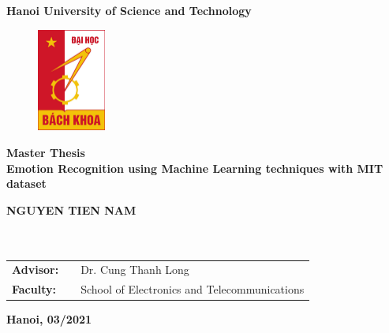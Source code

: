 
\begin{titlepage}
\thispagestyle{empty}
\begin{center}
\textbf{\large{Hanoi University of Science and Technology}} \\

\vspace{0.2cm}

\begin{figure}[htbp]
    \begin{center}
    \includegraphics[width=0.2\textwidth]{figs/hust-logo.jpg}
    \end{center}
\end{figure}

\vspace{0.5cm}

\textbf{\Huge{Master Thesis}} \\
\vspace{1.2cm}
\textbf{\LARGE{Emotion Recognition using Machine Learning techniques with MIT dataset}} \\

\vspace{1.0cm}

\textbf{\large{NGUYEN TIEN NAM}} \\
\small{\emailofauthor} \\
\vspace{0.3cm}
\textbf{\large{\majorofauthor}} \\
\vspace{2.5cm}

\small
\renewcommand{\arraystretch}{1.5} 
\begin{tabular}{lll}
    \textbf{Advisor:} & & Dr. Cung Thanh Long \\
    \textbf{Faculty:} & & School of Electronics and Telecommunications \\
\end{tabular}

\vspace{\fill}
\textbf{\normalsize{Hanoi, 03/2021}}
\end{center}
\end{titlepage}
